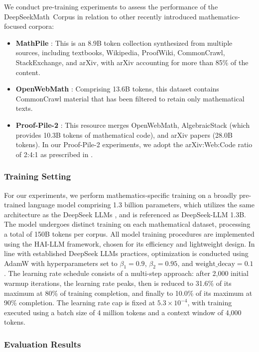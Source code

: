 \begin{itemize}[topsep=0pt]
We conduct pre-training experiments to assess the performance of the DeepSeekMath~Corpus in relation to other recently introduced mathematics-focused corpora:

\begin{itemize}[topsep=0pt]
    \item \textbf{MathPile} \citep{mathpile}: This is an 8.9B token collection synthesized from multiple sources, including textbooks, Wikipedia, ProofWiki, CommonCrawl, StackExchange, and arXiv, with arXiv accounting for more than 85\% of the content.
    \item \textbf{OpenWebMath} \citep{openwebmath}: Comprising 13.6B tokens, this dataset contains CommonCrawl material that has been filtered to retain only mathematical texts.
    \item \textbf{Proof-Pile-2} \citep{llemma}: This resource merges OpenWebMath, AlgebraicStack (which provides 10.3B tokens of mathematical code), and arXiv papers (28.0B tokens). In our Proof-Pile-2 experiments, we adopt the arXiv:Web:Code ratio of 2:4:1 as prescribed in \cite{llemma}.
\end{itemize}

\subsubsection{Training Setting}
\label{sec:quality-policy}
For our experiments, we perform mathematics-specific training on a broadly pre-trained language model comprising 1.3 billion parameters, which utilizes the same architecture as the DeepSeek LLMs \citep{deepseek-llm}, and is referenced as DeepSeek-LLM 1.3B. The model undergoes distinct training on each mathematical dataset, processing a total of 150B tokens per corpus. All model training procedures are implemented using the HAI-LLM \citep{haillm} framework, chosen for its efficiency and lightweight design. In line with established DeepSeek LLMs practices, optimization is conducted using AdamW \citep{adamW} with hyperparameters set to $\beta_1=0.9$, $\beta_2=0.95$, and $\mathrm{weight\_decay}=0.1$. The learning rate schedule consists of a multi-step approach: after 2,000 initial warmup iterations, the learning rate peaks, then is reduced to 31.6\% of its maximum at 80\% of training completion, and finally to 10.0\% of its maximum at 90\% completion. The learning rate cap is fixed at $5.3 \times 10^{-4}$, with training executed using a batch size of 4 million tokens and a context window of 4,000 tokens.

\subsubsection{Evaluation Results}


\end{itemize}

